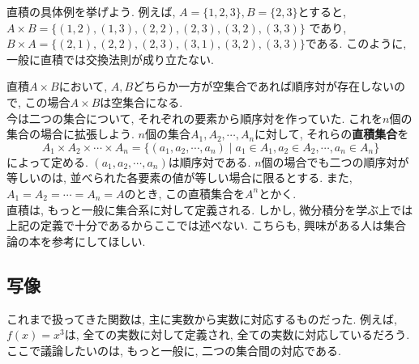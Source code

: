 \documentclass[a4j,dvipdfmx]{jsarticle}
\numberwithin{equation}{section}
\begin{document}
            直積の具体例を挙げよう. 例えば, $A=\{1,2,3\},B=\{2,3\}$とすると, $A\times B=\{(1,2),(1,3),(2,2),(2,3),(3,2),(3,3)\}$
            であり, $B\times A = \{(2,1),(2,2),(2,3),(3,1),(3,2),(3,3)\}$である. このように, 一般に直積では交換法則が成り立たない.

            直積$A\times B$において, $A,B$どちらか一方が空集合であれば順序対が存在しないので, この場合$A\times B$は空集合になる.\\

            今は二つの集合について, それぞれの要素から順序対を作っていた. これを$n$個の集合の場合に拡張しよう. $n$個の集合$A_1,A_2,\cdots,A_n$に対して, 
            それらの\textbf{直積集合}を
            \begin{equation}
                A_1\times A_2 \times \cdots \times A_n = \{(a_1,a_2,\cdots,a_n)\mid a_1\in A_1,a_2\in A_2,\cdots,a_n\in A_n\} \label{eq:集合論基礎:n個の直積の定義}
            \end{equation}
            によって定める. $(a_1,a_2,\cdots,a_n)$は順序対である. $n$個の場合でも二つの順序対が等しいのは, 並べられた各要素の値が等しい場合に限るとする.
            また, $A_1=A_2=\cdots=A_n=A$のとき, この直積集合を$A^n$とかく.\\

            直積は, もっと一般に集合系に対して定義される. しかし, 微分積分を学ぶ上では上記の定義で十分であるからここでは述べない.
            こちらも, 興味がある人は集合論の本を参考にしてほしい.
        \clearpage
        \subsection{写像}
            これまで扱ってきた関数は, 主に実数から実数に対応するものだった. 例えば, $f(x)=x^3$は, 全ての実数に対して定義され, 全ての実数に対応しているだろう.
            ここで議論したいのは, もっと一般に, 二つの集合間の対応である.
            
\end{document}
